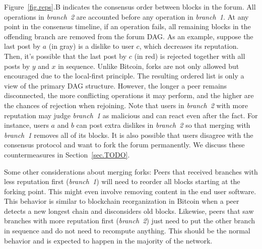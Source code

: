 \documentclass[10pt,journal,compsoc]{IEEEtran}
\newcommand{\reps}     {\emph{reps}\xspace}
\begin{document}
Figure~\ref{fig.reps}.B indicates the consensus order between blocks in the
forum.
All operations in \emph{branch~2} are accounted before any operation in
\emph{branch~1}.
%
At any point in the consensus timeline, if an operation fails, all remaining
blocks in the offending branch are removed from the forum DAG.
As an example, suppose the last post by $a$ (in gray) is a dislike to user $c$,
which decreases its reputation.
Then, it's possible that the last post by $c$ (in red) is rejected together
with all posts by $y$ and $x$ in sequence.
%
Unlike Bitcoin, forks are not only allowed but encouraged due to the
local-first principle.
The resulting ordered list is only a view of the primary DAG structure.
However, the longer a peer remains disconnected, the more conflicting
operations it may perform, and the higher are the chances of rejection when
rejoining.
%
Note that users in \emph{branch~2} with more reputation may judge
\emph{branch~1} as malicious and can react even after the fact.
For instance, users $a$ and $b$ can post extra dislikes in \emph{branch~2} so
that merging with \emph{branch~1} removes all of its blocks.
It is also possible that users disagree with the consensus protocol and want to
fork the forum permanently.
We discuss these countermeasures in Section~\ref{sec.TODO}.

Some other considerations about merging forks:
Peers that received branches with less reputation first (\emph{branch~1}) will
need to reorder all blocks starting at the forking point.
This might even involve removing content in the end user software.
This behavior is similar to blockchain reorganization in Bitcoin when a peer
detects a new longest chain and disconsiders old blocks.
%
Likewise, peers that saw branches with more reputation first (\emph{branch~2})
just need to put the other branch in sequence and do not need to recompute
anything.
This should be the normal behavior and is expected to happen in the majority of
the network.

\end{document}
